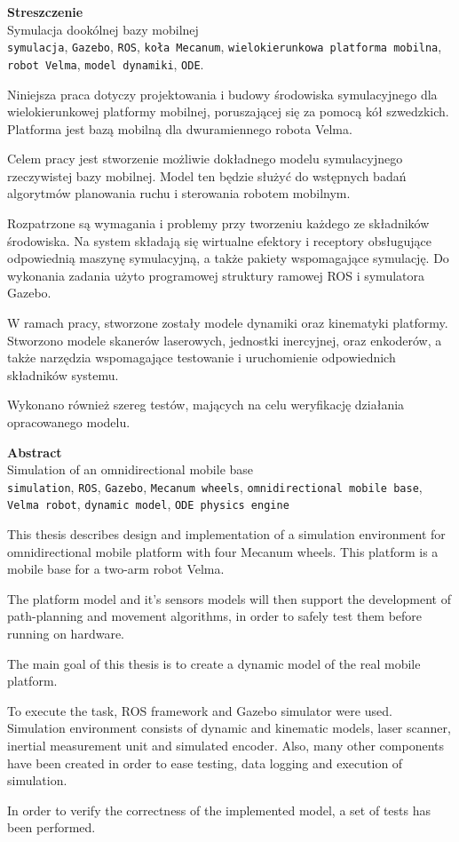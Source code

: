 {\centering\Large\bfseries Streszczenie \\}
 Symulacja dookólnej bazy mobilnej \\
 \texttt{symulacja}, \texttt{Gazebo}, \texttt{ROS}, \texttt{koła Mecanum}, \texttt{wielokierunkowa platforma mobilna}, \texttt{robot Velma}, \texttt{model dynamiki}, \texttt{ODE}.

Niniejsza praca dotyczy projektowania i budowy środowiska symulacyjnego dla wielokierunkowej platformy mobilnej, poruszającej się za pomocą kół szwedzkich.
Platforma jest bazą mobilną dla dwuramiennego robota Velma. 

Celem pracy jest stworzenie możliwie dokładnego modelu symulacyjnego rzeczywistej bazy mobilnej.
Model ten będzie służyć do wstępnych badań algorytmów planowania ruchu i sterowania robotem mobilnym.

Rozpatrzone są wymagania i problemy przy tworzeniu każdego ze składników środowiska.
Na system składają się wirtualne efektory i receptory obsługujące odpowiednią maszynę symulacyjną, a także pakiety wspomagające symulację.
Do wykonania zadania użyto programowej struktury ramowej ROS i symulatora Gazebo.

W ramach pracy, stworzone zostały modele dynamiki oraz kinematyki platformy.
Stworzono modele skanerów laserowych, jednostki inercyjnej, oraz enkoderów, a także narzędzia wspomagające testowanie i uruchomienie odpowiednich składników systemu.

Wykonano również szereg testów, mających na celu weryfikację działania opracowanego modelu.

{\centering\Large\bfseries Abstract \\}
 Simulation of an omnidirectional mobile base \\
 \texttt{simulation}, \texttt{ROS}, \texttt{Gazebo}, \texttt{Mecanum wheels}, \texttt{omnidirectional mobile base}, \texttt{Velma robot}, \texttt{dynamic model}, \texttt{ODE physics engine}

This thesis describes design and implementation of a simulation environment for omnidirectional mobile platform with four Mecanum wheels.
This platform is a mobile base for a two-arm robot Velma.

The platform model and it's sensors models will then support the development of path-planning and movement algorithms, in order to safely test them before running on
hardware.

The main goal of this thesis is to create a dynamic model of the real mobile platform.

To execute the task, ROS framework and Gazebo simulator were used.
Simulation environment consists of dynamic and kinematic models, laser scanner, inertial measurement unit and simulated encoder. 
Also, many other components have been created in order to ease testing, data logging and execution of simulation.

In order to verify the correctness of the implemented model, a set of tests has been performed.
